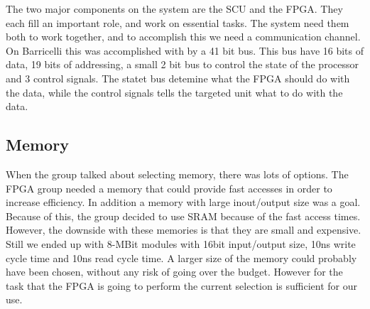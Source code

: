 The two major components on the system are the SCU and the FPGA.
They each fill an important role, and work on essential tasks.
The system need them both to work together, and to accomplish this we need a communication channel.
On Barricelli this was accomplished with by a 41 bit bus.
This bus have 16 bits of data, 19 bits of addressing, a small 2 bit bus to control the state of the processor and 3 control signals.
The statet bus detemine what the FPGA should do with the data, while the control signals tells the targeted unit what to do with the data. 



\subsection{Memory} \label{pcb:design-choices:ss:memory}
When the group talked about selecting memory, there was lots of options.
The FPGA group needed a memory that could provide fast accesses in order to increase efficiency.
In addition a memory with large inout/output size was a goal.
Because of this, the group decided to use SRAM because of the fast access times.
However, the downside with these memories is that they are small and expensive.
Still we ended up with 8-MBit modules with 16bit input/output size, 10ns write cycle time and 10ns read cycle time.
A larger size of the memory could probably have been chosen, without any risk of going over the budget.
However for the task that the FPGA is going to perform the current selection is sufficient for our use.

